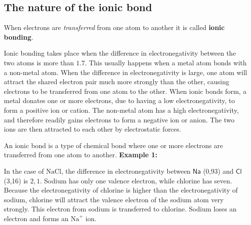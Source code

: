             \subsection*{The nature of the ionic bond}
            \nopagebreak
        \label{m38684*id142190}When electrons are \textsl{transferred} from one atom to another it is called \textbf{ionic bonding}.\par 
        \label{m38684*id142218}Ionic bonding takes place when the difference in electronegativity between the two atoms is more than $1.7$. This usually happens when a metal atom bonds with a non-metal atom. When the difference in electronegativity is large, one atom will attract the shared electron pair much more strongly than the other, causing electrons to be transferred from one atom to the other. When ionic bonds form, a metal donates one or more electrons, due to having a low electronegativity, to form a positive ion or cation. The non-metal atom has a high electronegativity, and therefore readily gains electrons to form a negative ion or anion. The two ions are then attracted to each other by electrostatic forces. \par 
\label{m38684*fhsst!!!underscore!!!id456}
 { \label{m38684*meaningfhsst!!!underscore!!!id456}
        An ionic bond is a type of chemical bond where one or more electrons are transferred from one atom to another.
         } 
        \label{m38684*id142248}
          \textbf{Example 1:}
        \par 
        \label{m38684*id142255}In the case of $\text{NaCl}$, the difference in electronegativity between $\textsf{Na}$ (0,93) and $\textsf{Cl}$ (3,16) is $2,1$. Sodium has only one valence electron, while chlorine has seven. Because the electronegativity of chlorine is higher than the electronegativity of sodium, chlorine will attract the valence electron of the sodium atom very strongly. This electron from sodium is transferred to chlorine. Sodium loses an electron and forms an ${\text{Na}}^{+}$ ion. \\
  \par

